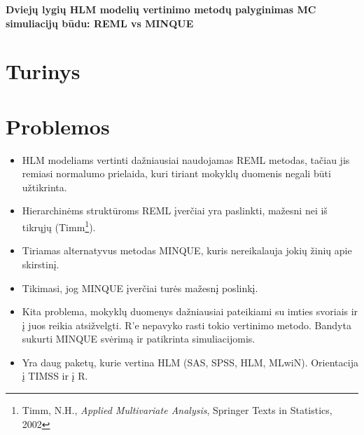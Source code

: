 \documentclass[12pt,a4paper]{article}
\begin{document}
	\begin{center}{\large\textbf{Dviejų lygių HLM modelių vertinimo metodų palyginimas MC simuliacijų būdu: REML vs MINQUE}}\end{center}

\section{Turinys}



\section{Problemos}
\begin{itemize}
\item HLM modeliams vertinti dažniausiai naudojamas REML metodas, tačiau jis remiasi normalumo prielaida, kuri tiriant mokyklų duomenis negali būti užtikrinta.
\item Hierarchinėms struktūroms REML įverčiai yra paslinkti, mažesni nei iš tikrųjų (Timm\footnote{Timm, N.H., \textit{Applied Multivariate Analysis}, Springer Texts in Statistics, 2002}).
\item Tiriamas alternatyvus metodas MINQUE, kuris nereikalauja jokių žinių apie skirstinį.
\item Tikimasi, jog MINQUE įverčiai turės mažesnį poslinkį.
\item Kita problema, mokyklų duomenys dažniausiai pateikiami su imties svoriais ir į juos reikia atsižvelgti. R'e nepavyko rasti tokio vertinimo metodo. Bandyta sukurti MINQUE svėrimą ir patikrinta simuliacijomis.
\item  Yra daug paketų, kurie vertina HLM (SAS, SPSS, HLM, MLwiN). Orientacija į TIMSS ir į R.
\end{itemize}
\end{document}
